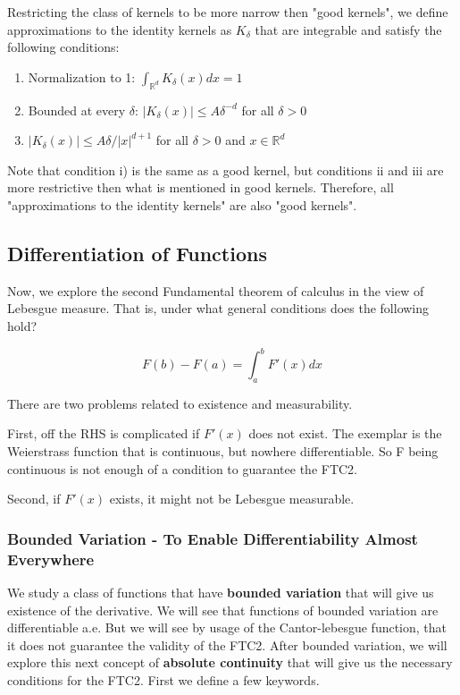 \documentclass[class=article, crop=false]{standalone}
\begin{document}
		\begin{definition} 
			Restricting the class of kernels to be more narrow then "good kernels", we define approximations to the identity kernels as $K_\delta$ that are integrable and satisfy the following conditions:

			\begin{enumerate}
				\item Normalization to 1: $\int_{\mathbb{R}^d} K_\delta(x) dx = 1$
				\item Bounded at every $\delta$: $|K_\delta(x)| \le A \delta^{-d}$ for all $\delta > 0$ 
				\item $|K_\delta (x) | \le  A \delta / |x|^{d+1}$ for all $\delta > 0$ and $x \in \mathbb{R}^d$
			\end{enumerate}

			Note that condition i) is the same as a good kernel, but conditions ii and iii are more restrictive then what is mentioned in good kernels. Therefore, all "approximations to the identity kernels" are also "good kernels".
		\end{definition}
	\subsection{Differentiation of Functions}
		Now, we explore the second Fundamental theorem of calculus in the view of Lebesgue measure. That is, under what general conditions does the following hold?

			$$F(b) - F(a) = \int_a^b F'(x) dx$$

		There are two problems related to existence and measurability.

		First, off the RHS is complicated if $F'(x)$ does not exist. The exemplar is the Weierstrass function that is continuous, but nowhere differentiable. So F being continuous is not enough of a condition to guarantee the FTC2. 

		Second, if $F'(x)$ exists, it might not be Lebesgue measurable.

		\subsubsection{Bounded Variation - To Enable Differentiability Almost Everywhere}
			We study a class of functions that have \textbf{bounded variation} that will give us existence of the derivative. We will see that functions of bounded variation are differentiable a.e. But we will see by usage of the Cantor-lebesgue function, that it does not guarantee the validity of the FTC2. After bounded variation, we will explore this next concept of \textbf{absolute continuity} that will give us the necessary conditions for the FTC2. First we define a few keywords.
\end{document}
